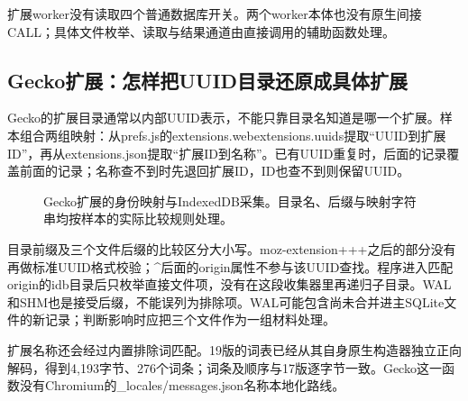 \documentclass[UTF8,a4paper,zihao=5,fontset=windows]{ctexart}
\newcommand{\code}[1]{{\ttfamily\small #1}}
\begin{document}
扩展worker没有读取四个普通数据库开关。两个worker本体也没有原生间接CALL；具体文件枚举、读取与结果通道由直接调用的辅助函数处理。
\subsection{Gecko扩展：怎样把UUID目录还原成具体扩展}
Gecko的扩展目录通常以内部UUID表示，不能只靠目录名知道是哪一个扩展。样本组合两组映射：从\code{prefs.js}的\code{extensions.webextensions.uuids}提取“UUID到扩展ID”，再从\code{extensions.json}提取“扩展ID到名称”。已有UUID重复时，后面的记录覆盖前面的记录；名称查不到时先退回扩展ID，ID也查不到则保留UUID。

\begin{figure}[htbp]\centering
{}
\caption{Gecko扩展的身份映射与IndexedDB采集。目录名、后缀与映射字符串均按样本的实际比较规则处理。}
\end{figure}

目录前缀及三个文件后缀的比较区分大小写。\code{moz-extension+++}之后的部分没有再做标准UUID格式校验；\code{\textasciicircum{}}后面的origin属性不参与该UUID查找。程序进入匹配origin的\code{idb}目录后只枚举直接文件项，没有在这段收集器里再递归子目录。WAL和SHM也是接受后缀，不能误列为排除项。WAL可能包含尚未合并进主SQLite文件的新记录；判断影响时应把三个文件作为一组材料处理。\cite{sqlitewal}

扩展名称还会经过内置排除词匹配。19版的词表已经从其自身原生构造器独立正向解码，得到4,193字节、276个词条；词条及顺序与17版逐字节一致。Gecko这一函数没有Chromium的\code{\_locales/messages.json}名称本地化路线。
\end{document}
